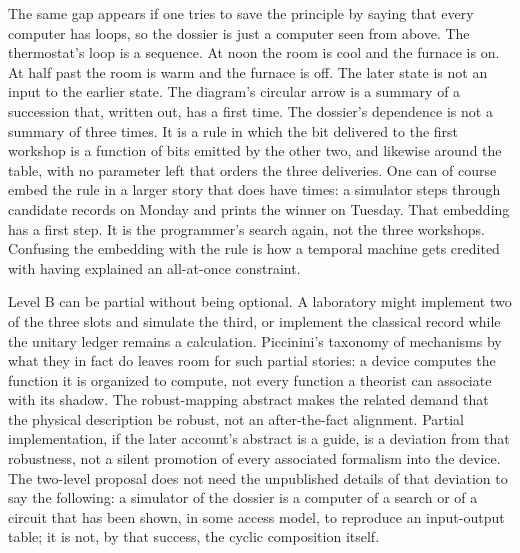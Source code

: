 \documentclass[11pt]{article}
\begin{document}
The same gap appears if one tries to save the principle by saying that every computer has loops, so the dossier is just a computer seen from above. The thermostat’s loop is a sequence. At noon the room is cool and the furnace is on. At half past the room is warm and the furnace is off. The later state is not an input to the earlier state. The diagram’s circular arrow is a summary of a succession that, written out, has a first time. The dossier’s dependence is not a summary of three times. It is a rule in which the bit delivered to the first workshop is a function of bits emitted by the other two, and likewise around the table, with no parameter left that orders the three deliveries. One can of course embed the rule in a larger story that does have times: a simulator steps through candidate records on Monday and prints the winner on Tuesday. That embedding has a first step. It is the programmer’s search again, not the three workshops. Confusing the embedding with the rule is how a temporal machine gets credited with having explained an all-at-once constraint.

Level B can be partial without being optional. A laboratory might implement two of the three slots and simulate the third, or implement the classical record while the unitary ledger remains a calculation. Piccinini’s taxonomy of mechanisms by what they in fact do leaves room for such partial stories: a device computes the function it is organized to compute, not every function a theorist can associate with its shadow. The robust-mapping abstract makes the related demand that the physical description be robust, not an after-the-fact alignment. Partial implementation, if the later account’s abstract is a guide, is a deviation from that robustness, not a silent promotion of every associated formalism into the device. The two-level proposal does not need the unpublished details of that deviation to say the following: a simulator of the dossier is a computer of a search or of a circuit that has been shown, in some access model, to reproduce an input-output table; it is not, by that success, the cyclic composition itself.
\end{document}
